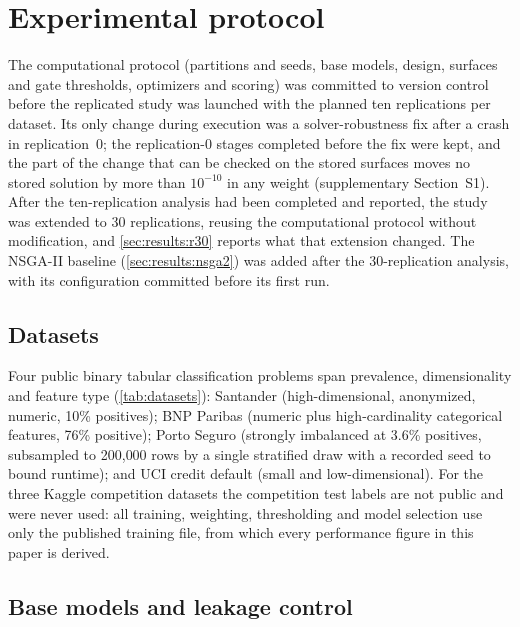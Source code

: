 \section{Experimental protocol}
\label{sec:protocol}

The computational protocol (partitions and seeds, base models, design, surfaces and gate thresholds, optimizers and
scoring) was committed to version control before the replicated study was launched with the planned ten
replications per dataset. Its only change during execution was a solver-robustness fix after a crash in
replication~0; the replication-0 stages completed before the fix were kept, and the part of the change that can be
checked on the stored surfaces moves no stored solution by more than $10^{-10}$ in any weight (supplementary Section~S1). After the ten-replication
analysis had been completed and reported, the study was extended to 30 replications, reusing the computational
protocol without modification, and \cref{sec:results:r30} reports what that extension changed. The NSGA-II baseline
(\cref{sec:results:nsga2}) was added after the 30-replication analysis, with its configuration committed before its
first run.

\subsection{Datasets}
\label{sec:protocol:data}

Four public binary tabular classification problems span prevalence, dimensionality and feature type
(\cref{tab:datasets}): Santander \citep{kagglesantander} (high-dimensional, anonymized, numeric, 10\% positives);
BNP Paribas \citep{kagglebnp} (numeric plus high-cardinality categorical features, 76\% positive); Porto Seguro
\citep{kaggleporto} (strongly imbalanced at 3.6\% positives, subsampled to 200{,}000 rows by a single stratified
draw with a recorded seed to bound runtime); and UCI credit default \citep{yeh2009ucidataset} (small and
low-dimensional). For the three Kaggle competition datasets the competition test labels are not
public and were never used: all training, weighting, thresholding and model selection use only the published training
file, from which every performance figure in this paper is derived.



\subsection{Base models and leakage control}
\label{sec:protocol:models}

